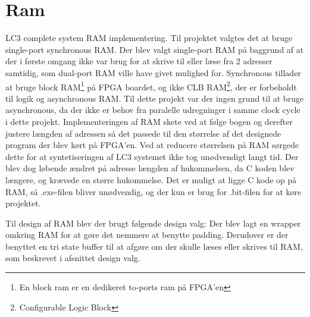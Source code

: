 \section{Ram}
LC3 complete system RAM implementering.
Til projektet valgtes det at bruge single-port synchronous RAM. Der blev valgt single-port RAM på baggrund af at der i første omgang ikke var brug for at skrive til eller læse fra 2 adresser samtidig, som dual-port RAM ville have givet mulighed for. Synchronous tillader at bruge block RAM\footnote{En block ram er en dedikeret to-ports ram på FPGA'en} på FPGA boardet, og ikke CLB RAM\footnote{Configurable Logic Block}, der er forbeholdt til logik og asynchronous RAM. Til dette projekt var der ingen grund til at bruge asynchronous, da der ikke er behov fra paralelle udregninger i samme clock cycle i dette projekt. Implementeringen af RAM skete ved at følge bogen %
og derefter justere længden af adressen så det passede til den størrelse af det designede program der blev kørt på FPGA'en. Ved at reducere størrelsen på RAM sørgede dette for at syntetiseringen af LC3 systemet ikke tog unødvendigt langt tid. Der blev dog løbende ændret på adresse længden af hukommelsen, da C koden blev længere, og krævede en større hukommelse. Det er muligt at ligge C kode op på RAM, så .exe-filen bliver unødvendig, og der kun er brug for .bit-filen for at køre projektet.

Til design af RAM blev der brugt følgende design valg: Der blev lagt en wrapper omkring RAM for at gøre det nemmere at benytte padding. Derudover er der benyttet en tri state buffer til at afgøre om der skulle læses eller skrives til RAM, som beskrevet i afsnittet design valg.
